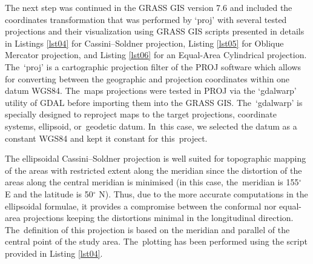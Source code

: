 \documentclass[technologies,article,accept,pdftex,moreauthors]{Definitions/mdpi}
\begin{document}
The next step was continued in the GRASS GIS version 7.6 and included the coordinates transformation that was performed by ‘proj’ with several tested projections and their visualization using GRASS GIS scripts presented in details in Listings \ref{lst04} for Cassini--Soldner projection, Listing \ref{lst05} for Oblique Mercator projection, and Listing \ref{lst06} for an Equal-Area Cylindrical projection. The~‘proj’ is a cartographic projection filter of the PROJ software which allows for converting between the geographic and projection coordinates within one datum WGS84. The~maps projections were tested in PROJ via the ‘gdalwarp’ utility of GDAL before importing them into the GRASS GIS. The~‘gdalwarp’ is specially designed to reproject maps to the target projections, coordinate systems, ellipsoid, or~geodetic datum. In~this case, we selected the datum as a constant WGS84 and kept it constant for this~project. 

{The ellipsoidal Cassini--Soldner projection is well suited for topographic mapping of the areas with restricted extent along the meridian since the distortion of the areas along the central meridian is minimised (in this case, the~meridian is} 155$^{\circ}$ E {and the latitude is} 50$^{\circ}$ {N). Thus, due to the more accurate computations in the ellipsoidal formulae, it provides a compromise between the conformal nor equal-area projections keeping the distortions minimal in the longitudinal direction. The~definition of this projection is based on the meridian and parallel of the central point of the study area. The~plotting has been performed using the script provided in Listing} \ref{lst04}.
\end{document}
